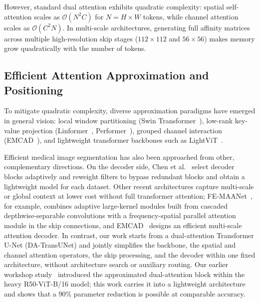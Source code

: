 However, standard dual attention exhibits quadratic complexity: spatial self-attention scales as $\mathcal{O}(N^2 C)$ for $N = H \times W$ tokens, while channel attention scales as $\mathcal{O}(C^2 N)$. In multi-scale architectures, generating full affinity matrices across multiple high-resolution skip stages ($112 \times 112$ and $56 \times 56$) makes memory grow quadratically with the number of tokens.

\subsection{Efficient Attention Approximation and Positioning}
To mitigate quadratic complexity, diverse approximation paradigms have emerged in general vision: local window partitioning (Swin Transformer~\cite{liu2021swin}), low-rank key-value projection (Linformer~\cite{wang2020linformer}, Performer~\cite{choromanski2020performer}), grouped channel interaction (EMCAD~\cite{rahman2024emcad}), and lightweight transformer backbones such as LightViT~\cite{huang2022lightvit}. 

Efficient medical image segmentation has also been approached from other, complementary directions. On the decoder side, Chen et al.~\cite{chen2023desfir} select decoder blocks adaptively and reweight filters to bypass redundant blocks and obtain a lightweight model for each dataset. Other recent architectures capture multi-scale or global context at lower cost without full transformer attention; FE-MAANet~\cite{peng2026femaanet}, for example, combines adaptive large-kernel modules built from cascaded depthwise-separable convolutions with a frequency-spatial parallel attention module in the skip connections, and EMCAD~\cite{rahman2024emcad} designs an efficient multi-scale attention decoder. In contrast, our work starts from a dual-attention Transformer U-Net (DA-TransUNet) and jointly simplifies the backbone, the spatial and channel attention operators, the skip processing, and the decoder within one fixed architecture, without architecture search or auxiliary routing. Our earlier workshop study~\cite{zhong2026approxda} introduced the approximated dual-attention block within the heavy R50-ViT-B/16 model; this work carries it into a lightweight architecture and shows that a $90\%$ parameter reduction is possible at comparable accuracy.